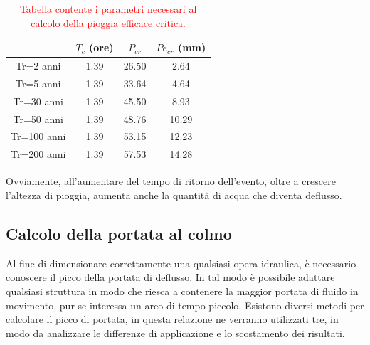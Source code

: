 \begin{table}[H] \centering
    \caption{\textcolor{red}{Tabella contente i parametri necessari al calcolo della pioggia efficace critica.}}
    \begin{tabular}{cccc}
        \toprule
        & $T_c$ (ore) & $P_{cr}$  & $Pe_{cr}$ (mm) \\
        \midrule
        Tr=2 anni   & 1.39     & 26.50 & 2.64       \\
        Tr=5 anni   & 1.39     & 33.64 & 4.64       \\
        Tr=30 anni  & 1.39     & 45.50 & 8.93       \\
        Tr=50 anni  & 1.39     & 48.76 & 10.29      \\
        Tr=100 anni & 1.39     & 53.15 & 12.23      \\
        Tr=200 anni & 1.39     & 57.53 & 14.28      \\
        \bottomrule
\end{tabular}
\label{parametri_pioggia_efficace}
\end{table}
Ovviamente, all'aumentare del tempo di ritorno dell'evento, oltre a crescere l'altezza di pioggia, aumenta anche la quantità di acqua che diventa deflusso.

\subsection{Calcolo della portata al colmo}
Al fine di dimensionare correttamente una qualsiasi opera idraulica, è necessario conoscere il picco della portata di deflusso. In tal modo è possibile adattare qualsiasi struttura in modo che riesca a contenere la maggior portata di fluido in movimento, pur se interessa un arco di tempo piccolo.
Esistono diversi metodi per calcolare il picco di portata, in questa relazione ne verranno utilizzati tre, in modo da analizzare le differenze di applicazione e lo scostamento dei risultati.
